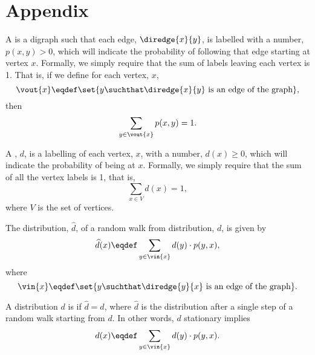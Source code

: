 \documentclass[handout]{mcs}
\begin{document}




\section*{Appendix}

A  is a digraph such that each edge,
$\diredge{x}{y}$, is labelled with a number, $p(x,y) > 0$, which will
indicate the probability of following that edge starting at vertex $x$.
Formally, we simply require that the sum of labels leaving each vertex is
1.  That is, if we define for each vertex, $x$,
\[
\vout{x} \eqdef \set{y \suchthat \diredge{x}{y} \text{ is an edge of the
    graph}},
\]
then
\[
\sum_{y \in \vout{x}} p(x,y) = 1.
\]

A , $d$, is a labelling of each vertex, $x$, with a
number, $d(x) \geq 0$, which will indicate the probability of being at $x$.
Formally, we simply require that the sum of all the vertex labels is 1,
that is,
\[
\sum_{x \in V} d(x) = 1,
\]
where $V$ is the set of vertices.

The distribution, $\widehat{d}$,  of a random walk from
distribution, $d$, is given by
\[
\widehat{d}(x) \eqdef \sum_{y \in \vin{x}} d(y) \cdot p(y,x),
\]
where
\[
\vin{x} \eqdef \set{y \suchthat \diredge{y}{x} \text{ is an edge of the
    graph}}.
\]

A distribution $d$ is  if $\widehat{d} = d$, where 
$\widehat{d}$ is the distribution after a single step of a random walk
starting from $d$.
In other words, $d$ stationary implies
\[
d(x) \eqdef \sum_{y \in \vin{x}} d(y) \cdot p(y,x).
\]
\end{document}
